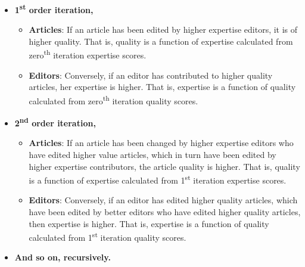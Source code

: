 \begin{itemize}
  \item {\bf 1\textsuperscript{st} order iteration,}  
  \begin{itemize}
  \item {\bf Articles}: If an article has been edited by higher expertise editors, it is of higher quality. That is, quality is a function of expertise calculated from zero\textsuperscript{th} iteration expertise scores.
  \item {\bf Editors}: Conversely, if an editor has contributed to higher quality articles, her expertise is higher. That is, expertise is a function of quality calculated from zero\textsuperscript{th} iteration quality scores.
  \end{itemize}
  \item {\bf 2\textsuperscript{nd} order iteration,}
    \begin{itemize}
  \item {\bf Articles}: If an article has been changed by higher expertise editors who have edited higher value articles, which in turn have been edited by higher expertise contributors, the article quality is higher. That is, quality is a function of expertise calculated from 1\textsuperscript{st} iteration expertise scores.
  \item {\bf Editors}: Conversely, if an editor has edited higher quality articles, which have been edited by better editors who have edited higher quality articles, then expertise is higher. That is, expertise is a function of quality calculated from 1\textsuperscript{st} iteration quality scores.
  \end{itemize}
 \item {\bf And so on, recursively.}\\
\end{itemize}


